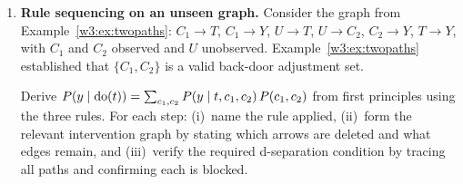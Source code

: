 \documentclass[master.tex]{subfiles}
\begin{document}
\begin{enumerate}[label=\textbf{\arabic*.}, leftmargin=*, itemsep=10pt]
  \begin{enumerate}[label=(\alph*)]
    \item Let $\mathcal{M}$ be a structural causal model Markov with
          respect to $\Gcal$, and let $\mathbf{S}$ satisfy the back-door
          criterion for $(T, Y)$ in $\Gcal$ with positivity.  Prove
          that
          \[
            P(y \mid \doop(t))
            \;=\; \int P(y \mid t,\, \mathbf{s})\,dP(\mathbf{s}).
          \]
          (\textit{Hint}: begin with
          $P(y \mid \doop(t)) = \int P(y \mid \doop(t), \mathbf{s})
          \,P(\mathbf{s} \mid \doop(t))\,d\mathbf{s}$.
          Apply the Rule~3 graphical condition
          $(\mathbf{S} \indep T)_{\Gcal_{\overline{T}}}$, using
          back-door condition~1, to simplify $P(\mathbf{s} \mid
          \doop(t))$.  Then invoke the d-separation
          $(Y \indep T \mid \mathbf{S})_{\Gcal_{\underline{T}}}$,
          which back-door condition~2 implies, together with the
          truncated factorization, to argue
          $P(y \mid \doop(t), \mathbf{s}) = P(y \mid t,
          \mathbf{s})$.)

    \item Suppose $\mathbf{S}_1$ and $\mathbf{S}_2$ both satisfy the
          back-door criterion for $(T, Y)$ in $\Gcal$ (with
          positivity).  Deduce from part~(a) that
          \[
            \int P(y \mid t,\, \mathbf{s}_1)\,dP(\mathbf{s}_1)
            \;=\;
            \int P(y \mid t,\, \mathbf{s}_2)\,dP(\mathbf{s}_2).
          \]
          Interpret this result: the identification target
          $P(y \mid \doop(t))$ is unique even when the adjustment set
          is not.
  \end{enumerate}

  \item \textbf{Rule sequencing on an unseen graph.}
  Consider the graph from Example~\ref{w3:ex:twopaths}:
  $C_1 \to T$, $C_1 \to Y$, $U \to T$, $U \to C_2$, $C_2 \to Y$,
  $T \to Y$, with $C_1$ and $C_2$ observed and $U$ unobserved.
  Example~\ref{w3:ex:twopaths} established that $\{C_1, C_2\}$ is a
  valid back-door adjustment set.

  Derive
  $P(y \mid \mathrm{do}(t)) = \sum_{c_1,c_2}
  P(y \mid t, c_1, c_2)\,P(c_1, c_2)$
  from first principles using the three rules.  For each step:
  (i)~name the rule applied,
  (ii)~form the relevant intervention graph by stating which arrows are
       deleted and what edges remain, and
  (iii)~verify the required d-separation condition by tracing all paths
        and confirming each is blocked.


\end{enumerate}
\end{document}

